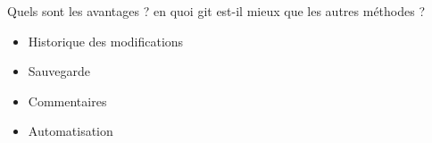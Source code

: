 \documentclass[usenames,dvipsnames]{beamer}
\begin{document}
\begin{frame}{Quels sont les avantages ?}
		en quoi git est-il mieux que les autres méthodes ?
			\begin{itemize}
				\item <1-> Historique des modifications
				\item <2-> Sauvegarde
				\item <3-> Commentaires
				\item <4-> Automatisation
			\end{itemize}
\end{frame}
	
	
	
	
	
	
\end{document}
